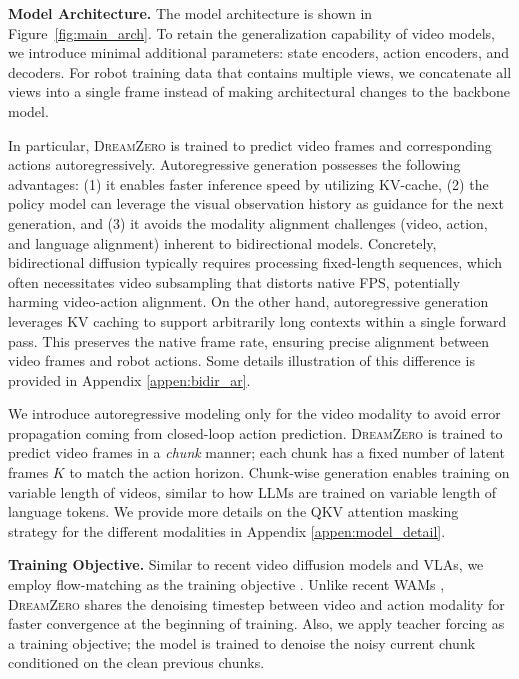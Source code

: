 \documentclass[10pt,logo,copyright]{nvidiatechreport}
\newcommand{\ourmethod}{\mbox{\textsc{DreamZero}}\xspace}
\begin{document}
\textbf{Model Architecture.} The model architecture is shown in Figure~\ref{fig:main_arch}. To retain the generalization capability of video models, we introduce minimal additional parameters: state encoders, action encoders, and decoders. For robot training data that contains multiple views, we concatenate all views into a single frame instead of making architectural changes to the backbone model.

In particular, \ourmethod is trained to predict video frames and corresponding actions autoregressively. Autoregressive generation possesses the following advantages: (1) it enables faster inference speed by utilizing KV-cache, (2) the policy model can leverage the visual observation history as guidance for the next generation, and (3) it avoids the modality alignment challenges (video, action, and language alignment) inherent to bidirectional models. Concretely, bidirectional diffusion typically requires processing fixed-length sequences, which often necessitates video subsampling that distorts native FPS, potentially harming video-action alignment. On the other hand, autoregressive generation leverages KV caching to support arbitrarily long contexts within a single forward pass. This preserves the native frame rate, ensuring precise alignment between video frames and robot actions.
 Some details illustration of this difference is provided in Appendix \ref{appen:bidir_ar}.

 We introduce autoregressive modeling only for the video modality to avoid error propagation coming from closed-loop action prediction. \ourmethod is trained to predict video frames in a \textit{chunk} manner; each chunk has a fixed number of latent frames $K$ to match the action horizon. Chunk-wise generation enables training on variable length of videos, similar to how LLMs are trained on variable length of language tokens. We provide more details on the QKV attention masking strategy for the different modalities in Appendix \ref{appen:model_detail}.

\textbf{Training Objective.} Similar to recent video diffusion models and VLAs, we employ flow-matching \citep{liu2022flow, lipman2022flow, albergo2023stochastic} as the training objective \citep{wan2025wan, ali2025world, teng2025magi}. Unlike recent WAMs \citep{zhu2025unified, kim2026cosmos, li2025unified, liao2025genie}, \ourmethod shares the denoising timestep between video and action modality for faster convergence at the beginning of training. 
Also, we apply teacher forcing \citep{jin2024pyramidal, gao2024ca2} as a training objective; the model is trained to denoise the noisy current chunk conditioned on the clean previous chunks. 
\end{document}

